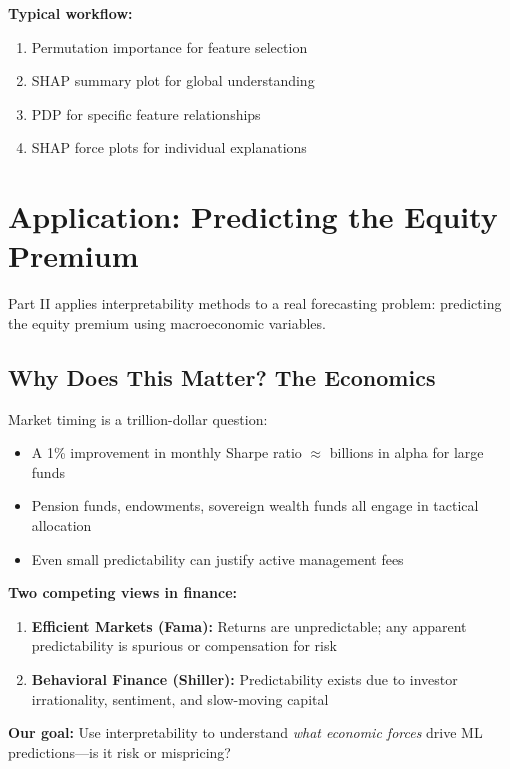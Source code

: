 \documentclass[11pt,a4paper]{article}
\begin{document}
\textbf{Typical workflow:}
\begin{enumerate}
    \item Permutation importance for feature selection
    \item SHAP summary plot for global understanding
    \item PDP for specific feature relationships
    \item SHAP force plots for individual explanations
\end{enumerate}

\section{Application: Predicting the Equity Premium}

Part II applies interpretability methods to a real forecasting problem: predicting the equity premium using macroeconomic variables.

\subsection{Why Does This Matter? The Economics}

Market timing is a trillion-dollar question:
\begin{itemize}
    \item A 1\% improvement in monthly Sharpe ratio $\approx$ billions in alpha for large funds
    \item Pension funds, endowments, sovereign wealth funds all engage in tactical allocation
    \item Even small predictability can justify active management fees
\end{itemize}

\textbf{Two competing views in finance:}
\begin{enumerate}
    \item \textbf{Efficient Markets (Fama):} Returns are unpredictable; any apparent predictability is spurious or compensation for risk
    \item \textbf{Behavioral Finance (Shiller):} Predictability exists due to investor irrationality, sentiment, and slow-moving capital
\end{enumerate}

\textbf{Our goal:} Use interpretability to understand \emph{what economic forces} drive ML predictions---is it risk or mispricing?
\end{document}
